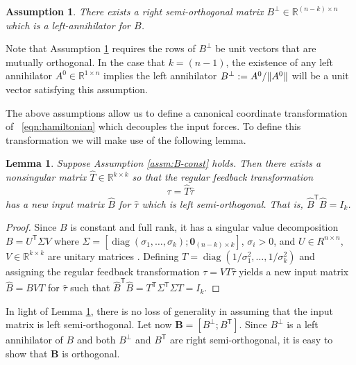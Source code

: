 \documentclass[journal,twoside,web]{ieeecolor}
\newtheorem{lemma}[thm]{Lemma} %
\newtheorem{assm}{Assumption} %
\DeclarePairedDelimiter{\norm}{\lVert}{\rVert}
\DeclareMathOperator{\Diag}{diag}
\newcommand*{\diag}[1]{\Diag\left(#1\right)}
\newcommand*{\tpose}{^\mathsf{T}}
\newcommand*{\R}{\mathbb{R}}
\newcommand*{\Id}[1]{I_{#1}}
\newcommand*{\Zmat}[1]{\bm{0}_{#1}}
\begin{document}
\begin{assm}\label{assm:B-perp}
    There exists a right semi-orthogonal matrix 
    \(B^\perp \in \R^{(n-k)\times n}\)
    which is a left-annihilator for \(B\). 
\end{assm}

Note that Assumption \ref{assm:B-perp} requires the rows of \(B^\perp\) be unit vectors
that are mutually orthogonal. 
In the case that \(k = (n-1)\), the existence of any left annihilator 
\(A^0 \in \R^{1\times n}\) implies the left annihilator 
\(B^\perp := A^0/\norm{A^0}\) will be a unit vector satisfying this assumption.

The above assumptions allow us to define a
canonical coordinate transformation of ~\eqref{eqn:hamiltonian} 
which decouples the input forces.
To define this transformation we will make use of the following lemma.

\begin{lemma}\label{lemma:B-orthogonal}
    Suppose Assumption \ref{assm:B-const} holds. Then
    there exists a nonsingular matrix \(\hat{T} \in \R^{k \times k}\) 
    so that the regular feedback transformation 
    \[
        \tau = \hat{T} \hat{\tau}
    \] 
    has a new input matrix \(\hat{B}\) for \(\hat{\tau}\) which is left
    semi-orthogonal.  
    That is, \(\hat{B}\tpose \hat{B} = \Id{k}\).
\end{lemma}
\begin{proof}
    Since \(B\) is constant and full rank, it has a singular value decomposition 
    \(B = U\tpose \Sigma V\) where 
    \(\Sigma = [\diag{\sigma_1,\ldots,\sigma_k}; \Zmat{(n-k)\times k}]\),
    \(\sigma_i > 0\), and \(U \in R^{n \times n}\),
    \(V \in \R^{k \times k}\) are unitary matrices \cite{calculating_svd}.
    Defining \(T = \diag{1/\sigma_1^2,\ldots,1/\sigma_k^2}\) and assigning the
    regular feedback transformation \(\tau = V T \hat{\tau}\) yields a new input
    matrix \(\hat{B} = B V T\) for \(\hat{\tau}\) such that
    \(\hat{B}\tpose \hat{B} = T\tpose \Sigma\tpose \Sigma T = \Id{k}\).
\end{proof}

In light of Lemma \ref{lemma:B-orthogonal}, there is no loss of generality in
assuming that the input matrix is left semi-orthogonal.
Let now \(\mathbf{B} = [B^\perp; B\tpose]\).
Since \(B^\perp\) is a left annihilator of \(B\) and both \(B^\perp\) and
\(B\tpose\) are right semi-orthogonal, it is easy to show that \(\mathbf{B}\) is
orthogonal.
\end{document}
